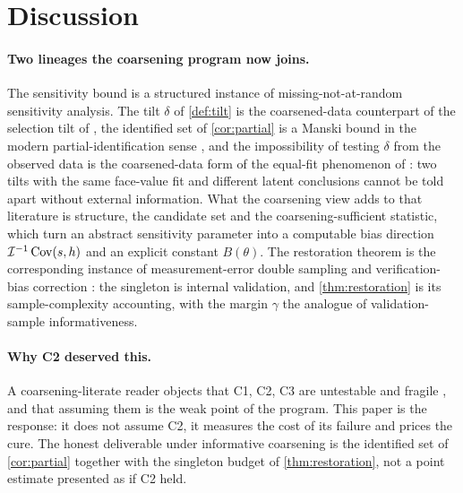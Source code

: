 \section{Discussion}
\label{sec:discussion}

\paragraph{Two lineages the coarsening program now joins.} The sensitivity bound is
a structured instance of missing-not-at-random sensitivity analysis. The tilt
$\delta$ of \cref{def:tilt} is the coarsened-data counterpart of the selection tilt
of \citet{copas1997inference}, the identified set of \cref{cor:partial} is a Manski
bound \citep{manski1989anatomy} in the modern partial-identification sense
\citep{tamer2010partial}, and the impossibility of testing $\delta$ from the
observed data is the coarsened-data form of the equal-fit phenomenon of
\citet{molenberghs2008every}: two tilts with the same face-value fit and different
latent conclusions cannot be told apart without external information. What the
coarsening view adds to that literature is structure, the candidate set and the
coarsening-sufficient statistic, which turn an abstract sensitivity parameter into a
computable bias direction $\mathcal{I}^{-1}\operatorname{Cov}(s, h)$ and an explicit constant
$B(\theta)$. The restoration theorem is the corresponding instance of
measurement-error double sampling and verification-bias correction
\citep{tenenbein1970double,begg1983assessment,carroll2006measurement}: the singleton
is internal validation, and \cref{thm:restoration} is its sample-complexity
accounting, with the margin $\gamma$ the analogue of validation-sample
informativeness.

\paragraph{Why C2 deserved this.} A coarsening-literate reader objects that C1, C2,
C3 are untestable and fragile \citep{grunwald2003updating,jaeger2005ignorability},
and that assuming them is the weak point of the program. This paper is the response:
it does not assume C2, it measures the cost of its failure and prices the cure. The
honest deliverable under informative coarsening is the identified set of
\cref{cor:partial} together with the singleton budget of \cref{thm:restoration},
not a point estimate presented as if C2 held.

